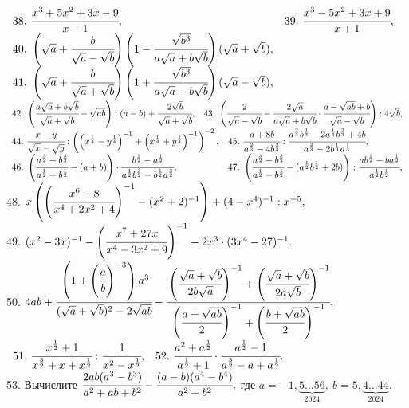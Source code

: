 \documentclass[12pt]{article}
\begin{document}
$\begin{array}{ll}
38.\ \cfrac{x^3+5x^2+3x-9}{x-1},&
39.\ \cfrac{x^3-5x^2+3x+9}{x+1},\\
40.\ \left(\sqrt{a}+\cfrac{b}{\sqrt{a}-\sqrt{b}}\right)\left(1-\cfrac{\sqrt{b^3}}{a\sqrt{a}+b\sqrt{b}}\right)
(\sqrt{a}+\sqrt{b}),\\
41.\ \left(\sqrt{a}+\cfrac{b}{\sqrt{a}+\sqrt{b}}\right)\left(1+\cfrac{\sqrt{b^3}}{a\sqrt{a}-b\sqrt{b}}\right)
(\sqrt{a}-\sqrt{b}),\end{array}$\\
$\begin{array}{ll}
42.\ \left(\cfrac{a\sqrt{a}+b\sqrt{b}}{\sqrt{a}+\sqrt{b}}-\sqrt{ab}\right):(a-b)+\cfrac{2\sqrt{b}}{\sqrt{a}+\sqrt{b}},&
43.\ \left(\cfrac{2}{\sqrt{a}-\sqrt{b}}-\cfrac{2\sqrt{a}}{a\sqrt{a}+b\sqrt{b}}\cdot\cfrac{a-\sqrt{ab}+b}{\sqrt{a}-\sqrt{b}}\right):4\sqrt{b},\end{array}$\\
$\begin{array}{ll}
44.\ \cfrac{x-y}{\sqrt{x}-\sqrt{y}}:\left(\left(x^\frac{1}{4}-y^\frac{1}{4}\right)^{-1}+\left(x^\frac{1}{4}+y^\frac{1}{4}\right)^{-1}\right)^{-2},&
45.\ \cfrac{a+8b}{a^\frac{2}{3}-4b^\frac{2}{3}}:\cfrac{a^\frac{2}{3}b^\frac{1}{3}-2a^\frac{1}{3}b^\frac{2}{3}+4b}{a^\frac{2}{3}-2b^\frac{1}{3}a^\frac{1}{3}},\\
46.\ \left(\cfrac{a^{\frac{3}{2}}+b^{\frac{3}{2}}}{a^{\frac{1}{2}}+b^{\frac{1}{2}}}-(a+b)\right)\cdot\cfrac{b^{\frac{1}{2}}-a^{\frac{1}{2}}}{a^{\frac{1}{2}}b^{\frac{3}{2}}-b^{\frac{1}{2}}a^{\frac{3}{2}}},&
47.\ \left(\cfrac{a^{\frac{3}{2}}-b^{\frac{3}{2}}}{a^{\frac{1}{2}}-b^{\frac{1}{2}}}-(a^{\frac{1}{2}}b^{\frac{1}{2}}+2b)\right):\cfrac{ab^{\frac{1}{2}}-ba^{\frac{1}{2}}}{a^{\frac{1}{2}}b^{\frac{1}{2}}},\\
\end{array}$\\
48. $x\left(\left(\cfrac{x^6-8}{x^4+2x^2+4}\right)^{-1}-(x^2+2)^{-1}\right)+(4-x^4)^{-1}:x^{-5},$\\
49. $(x^2-3x)^{-1}-\left(\cfrac{x^7+27x}{x^4-3x^2+9}\right)^{-1}-2x^3\cdot(3x^4-27)^{-1}.$\\
50. $4ab+\cfrac{\left(1+\left(\cfrac{a}{b}\right)^{-3}\right)a^3}{(\sqrt{a}+\sqrt{b})^2-2\sqrt{ab}}-
\cfrac{\left(\cfrac{\sqrt{a}+\sqrt{b}}{2b\sqrt{a}}\right)^{-1}+
\left(\cfrac{\sqrt{a}+\sqrt{b}}{2a\sqrt{b}}\right)^{-1}}{\left(\cfrac{a+\sqrt{ab}}{2}\right)^{-1}+
\left(\cfrac{b+\sqrt{ab}}{2}\right)^{-1}},$\\
$\begin{array}{ll}
51.\ \cfrac{x^\frac{1}{2}+1}{x^\frac{3}{2}+x+x^\frac{1}{2}}:\cfrac{1}{x^2-x^\frac{1}{2}},&
52.\ \cfrac{a^2+a^\frac{1}{2}}{a^\frac{1}{2}+1}\cdot\cfrac{a^\frac{1}{2}-1}{a^\frac{3}{2}-a+a^\frac{1}{2}}.
\end{array}$\\
53. Вычислите $\cfrac{2ab(a^3-b^3)}{a^2+ab+b^2}-\cfrac{(a-b)(a^4-b^4)}{a^2-b^2},$ где $a=-1,\underbrace{5\ldots56}_{2024},\ b=5,\underbrace{4\ldots44}_{2024}.$
\newpage
\end{document}
